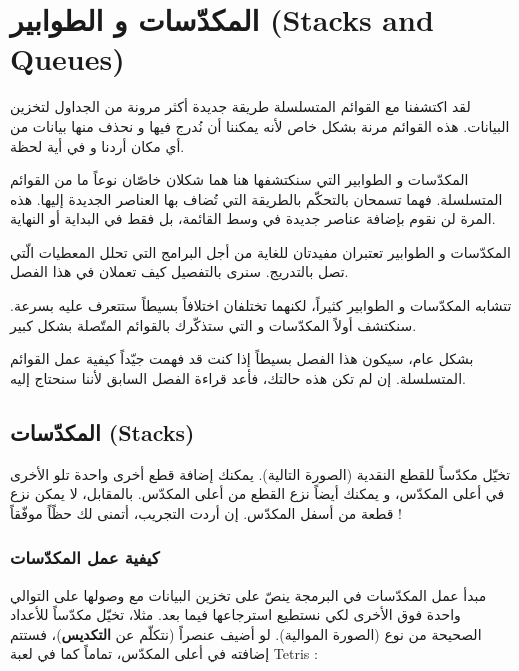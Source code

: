 \chapter{المكدّسات و الطوابير (\textenglish{Stacks and Queues})}

لقد اكتشفنا مع القوائم المتسلسلة طريقة جديدة أكثر مرونة من الجداول لتخزين البيانات. هذه القوائم مرنة بشكل خاص لأنه يمكننا أن نُدرج فيها و نحذف منها بيانات من أي مكان أردنا و في أية لحظة.

المكدّسات و الطوابير التي سنكتشفها هنا هما شكلان خاصّان نوعاً ما من القوائم المتسلسلة. فهما تسمحان بالتحكّم بالطريقة التي تُضاف بها العناصر الجديدة إليها. هذه المرة لن نقوم بإضافة عناصر جديدة في وسط القائمة، بل فقط في البداية أو النهاية. 

المكدّسات و الطوابير تعتبران مفيدتان للغاية من أجل البرامج التي تحلل المعطيات الّتي تصل بالتدريج. سنرى بالتفصيل كيف تعملان في هذا الفصل.

تتشابه المكدّسات و الطوابير كثيراً، لكنهما تختلفان اختلافاً بسيطاً ستتعرف عليه بسرعة. سنكتشف أولاً المكدّسات و التي ستذكّرك بالقوائم المتّصلة بشكل كبير. 

بشكل عام، سيكون هذا الفصل بسيطاً إذا كنت قد فهمت جيّداً كيفية عمل القوائم المتسلسلة. إن لم تكن هذه حالتك، فأعد قراءة الفصل السابق لأننا سنحتاج إليه.

\section{المكدّسات (\textenglish{Stacks})}

تخيّل مكدّساً للقطع النقدية (الصورة التالية). يمكنك إضافة قطع أخرى واحدة تلو الأخرى في أعلى المكدّس، و يمكنك أيضاً نزع القطع من أعلى المكدّس. بالمقابل، لا يمكن نزع قطعة من أسفل المكدّس. إن أردت التجريب، أتمنى لك حظًاً موفّقاً !


\subsection{كيفية عمل المكدّسات}

مبدأ عمل المكدّسات في البرمجة ينصّ على تخزين البيانات مع وصولها على التوالي واحدة فوق الأخرى لكي نستطيع استرجاعها فيما بعد. مثلا، تخيّل مكدّساً للأعداد الصحيحة من نوع 
(الصورة الموالية). لو أضيف عنصراً (نتكلّم عن
\textbf{التكديس})،
فستتم إضافته في أعلى المكدّس، تماماً كما في لعبة 
\textenglish{Tetris} :


